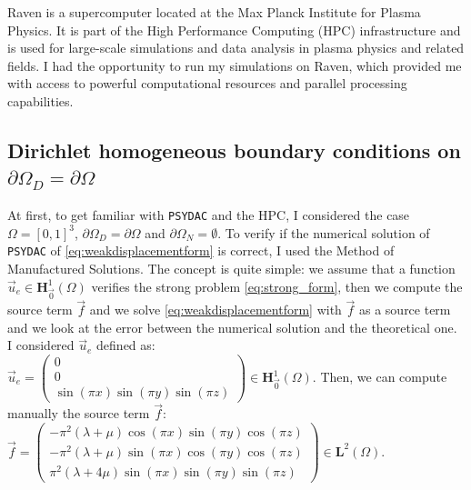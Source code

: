 \documentclass[a4paper,12pt,twoside]{report}
\begin{document}
Raven is a supercomputer located at the Max Planck Institute for Plasma Physics. It is part of the High Performance Computing (HPC) infrastructure and is used for large-scale simulations and data analysis in plasma physics and related fields. I had the opportunity to run my simulations on Raven, which provided me with access to powerful computational resources and parallel processing capabilities.


\subsection{Dirichlet homogeneous boundary conditions on $\partial\Omega_D = \partial\Omega$} \label{subsec:Dirichlet Homogeneous Boundary conditions on}

At first, to get familiar with \texttt{PSYDAC} and the HPC, I considered the case $\Omega = [0,1]^3$, $\partial \Omega_D = \partial\Omega$ and $\partial \Omega_N = \emptyset$. To verify if the numerical solution of \texttt{PSYDAC} of \eqref{eq:weakdisplacementform} is correct, I used the Method of Manufactured Solutions. The concept is quite simple: we assume that a function $\vec u_e \in \boldsymbol H^1_{\vec 0}(\Omega)$ verifies the strong problem \eqref{eq:strong_form}, then we compute the source term $\vec f$ and we solve \eqref{eq:weakdisplacementform} with $\vec f$ as a source term and we look at the error between the numerical solution and the theoretical one.
I considered $\vec u_e$ defined as: $\vec u_e = \begin{pmatrix}
	0 \\
	0 \\
\sin{\left(\pi x \right)} \sin{\left(\pi y \right)} \sin{\left(\pi z \right)}
\end{pmatrix} \in \boldsymbol H^1_{\vec 0}(\Omega).$ Then, we can compute manually the source term $\vec f$: $\vec f = \begin{pmatrix}
	 - \pi^{2} \left(\lambda + \mu\right) \cos{\left(\pi x \right)} \sin{\left(\pi y \right)}  \cos{\left(\pi z \right)} \\
	 - \pi^{2} \left(\lambda + \mu\right) \sin{\left(\pi x \right)} \cos{\left(\pi y \right)} \cos{\left(\pi z \right)} \\
	  \pi^{2} \left(\lambda + 4 \mu\right) \sin{\left(\pi x \right)} \sin{\left(\pi y \right)} \sin{\left(\pi z \right)}
\end{pmatrix} \in \boldsymbol L^2(\Omega).$
\end{document}

